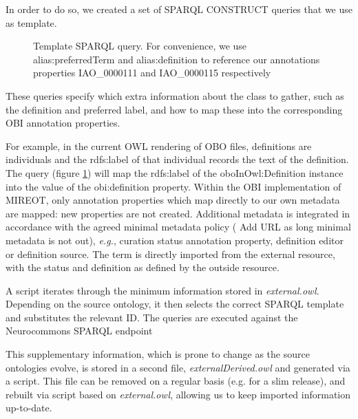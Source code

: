 \documentclass[a4paper,10pt,twocolumn]{article}
\begin{document}
In order to do so, we created a set of SPARQL \cite{RefWorks:1531} CONSTRUCT queries that we use as template. 
\begin{figure}[t]
%  
\scriptsize
 
\caption{Template SPARQL query. For convenience, we use alias:preferredTerm and
alias:definition to reference our annotations properties IAO\_0000111 and IAO\_0000115 respectively}
\label{fig:sparql}
\end{figure}
These queries specify which extra information about the class to gather, such as the definition and preferred label, and how to map these into the corresponding OBI annotation properties. 

For example, in the current OWL rendering of OBO files, definitions are individuals and the rdfs:label of that individual records the text of the definition.
The query (figure \ref{fig:sparql}) will map the rdfs:label of the oboInOwl:Definition instance into the value of the obi:definition property.
Within the OBI implementation of MIREOT, only annotation properties which map directly to our own metadata are mapped: new properties are not created.
Additional metadata is integrated in accordance with the agreed minimal metadata policy ( Add URL as long minimal metadata is not out), \emph{e.g.}, curation status annotation property, definition editor or definition source.
The term is directly imported from the external resource, with the status and definition as defined by the outside resource. %

A script iterates through the minimum information stored in \emph{external.owl}.
Depending on the source ontology, it then selects the correct SPARQL template and substitutes the relevant ID.
The queries are executed against the Neurocommons SPARQL endpoint\cite{RefWorks:1540}

This supplementary information, which is prone to change as the source ontologies evolve, is stored in a second file, \emph{externalDerived.owl} and generated via a script. 
This file can be removed on a regular basis (e.g. for a slim release), and rebuilt via script based on \emph{external.owl}, allowing us to keep imported information up-to-date.
\end{document}
